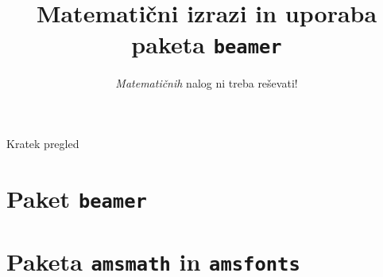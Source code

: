 \documentclass{beamer}
\begin{document}
\title{Matematični izrazi in uporaba paketa \texttt{beamer}}
\subtitle{\emph{Matematičnih} nalog ni treba reševati!}
\date{}
\titlepage



\begin{frame}{Kratek pregled}
    \tableofcontents[pausesections]
\end{frame}


\section{Paket \texttt{beamer}}




\section{Paketa \texttt{amsmath} in \texttt{amsfonts}}



\end{document}
